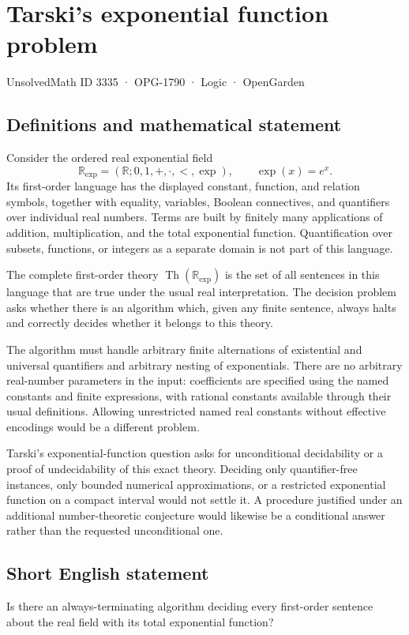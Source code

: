 \documentclass[11pt,a4paper]{article}
\begin{document}
\section*{Tarski's exponential function problem}\label{3335}
{\small UnsolvedMath ID 3335 · OPG-1790 · Logic · OpenGarden}
\subsection{Definitions and mathematical statement}
Consider the ordered real exponential field
\[
             \mathbb R_{\exp}=(\mathbb R;0,1,+,\cdot,<,\exp),
             \qquad \exp(x)=e^x.
\]
Its first-order language has the displayed constant, function, and relation symbols, together with equality, variables, Boolean connectives, and quantifiers over individual real numbers. Terms are built by finitely many applications of addition, multiplication, and the total exponential function. Quantification over subsets, functions, or integers as a separate domain is not part of this language.

The complete first-order theory $\operatorname{Th}(\mathbb R_{\exp})$ is the set of all sentences in this language that are true under the usual real interpretation. The decision problem asks whether there is an algorithm which, given any finite sentence, always halts and correctly decides whether it belongs to this theory.

The algorithm must handle arbitrary finite alternations of existential and universal quantifiers and arbitrary nesting of exponentials. There are no arbitrary real-number parameters in the input: coefficients are specified using the named constants and finite expressions, with rational constants available through their usual definitions. Allowing unrestricted named real constants without effective encodings would be a different problem.

Tarski's exponential-function question asks for unconditional decidability or a proof of undecidability of this exact theory. Deciding only quantifier-free instances, only bounded numerical approximations, or a restricted exponential function on a compact interval would not settle it. A procedure justified under an additional number-theoretic conjecture would likewise be a conditional answer rather than the requested unconditional one.
\subsection{Short English statement}
Is there an always-terminating algorithm deciding every first-order sentence about the real field with its total exponential function?
\end{document}
